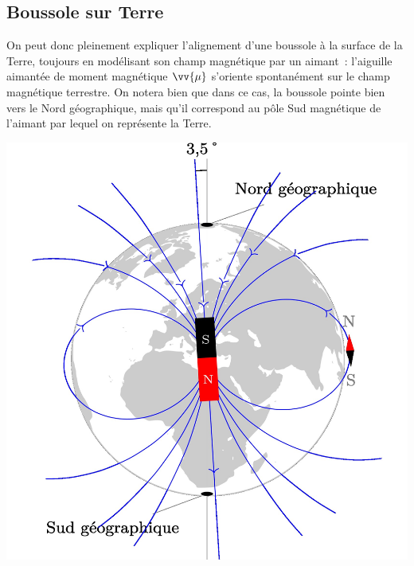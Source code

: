 \documentclass[../../main/main.tex]{subfiles}
\begin{document}
\subsection{Boussole sur Terre}
\label{ssec:boussoleterre}
\vspace{-15pt}
\noindent
\begin{minipage}[c]{.64\linewidth}
	On peut donc pleinement expliquer l'alignement d'une boussole à la surface de la
	Terre, toujours en modélisant son champ magnétique par un aimant~: l'aiguille
	aimantée de moment magnétique $\vv{\mu}$ s'oriente spontanément sur le champ
	magnétique terrestre.
	\bigbreak
	On notera bien que dans ce cas, la boussole pointe bien vers le Nord
	géographique, mais qu'il correspond au pôle Sud magnétique de l'aimant par
	lequel on représente la Terre.
\end{minipage}
\hfill
\begin{minipage}[c]{.35\linewidth}
	\begin{center}
		\includegraphics[scale=.7]{boussole_terre}
		\label{fig:bterre}
	\end{center}
\end{minipage}
\end{document}
